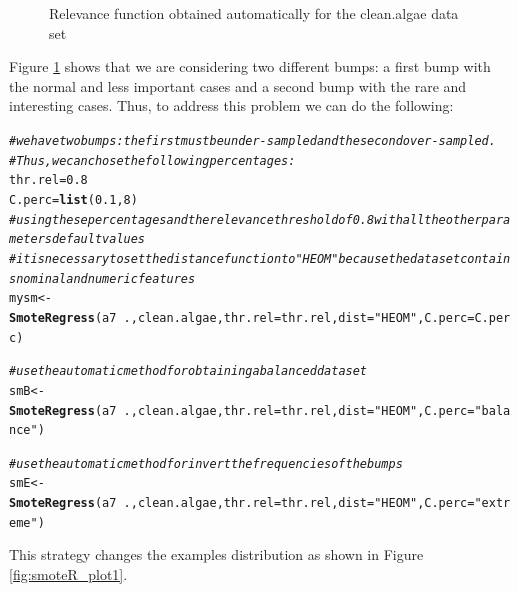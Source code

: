 \documentclass[10pt,a4paper]{article}\usepackage[]{graphicx}\usepackage[]{color}
\makeatletter
\newcommand{\hlnum}[1]{\textcolor[rgb]{0.686,0.059,0.569}{#1}}%
\newcommand{\hlstr}[1]{\textcolor[rgb]{0.192,0.494,0.8}{#1}}%
\newcommand{\hlcom}[1]{\textcolor[rgb]{0.678,0.584,0.686}{\textit{#1}}}%
\newcommand{\hlopt}[1]{\textcolor[rgb]{0,0,0}{#1}}%
\newcommand{\hlstd}[1]{\textcolor[rgb]{0.345,0.345,0.345}{#1}}%
\newcommand{\hlkwb}[1]{\textcolor[rgb]{0.69,0.353,0.396}{#1}}%
\newcommand{\hlkwc}[1]{\textcolor[rgb]{0.333,0.667,0.333}{#1}}%
\newcommand{\hlkwd}[1]{\textcolor[rgb]{0.737,0.353,0.396}{\textbf{#1}}}%
\newenvironment{kframe}{%
 \def\at@end@of@kframe{}%
 \ifinner\ifhmode%
  \def\at@end@of@kframe{\end{minipage}}%
  \begin{minipage}{\columnwidth}%
 \fi\fi%
 \def\FrameCommand##1{\hskip\@totalleftmargin \hskip-\fboxsep
 \colorbox{shadecolor}{##1}\hskip-\fboxsep
     \hskip-\linewidth \hskip-\@totalleftmargin \hskip\columnwidth}%
 \MakeFramed {\advance\hsize-\width
   \@totalleftmargin\z@ \linewidth\hsize
   \@setminipage}}%
 {\par\unskip\endMakeFramed%
 \at@end@of@kframe}
\newenvironment{knitrout}{}{} %
\makeatother
\begin{document}
\begin{knitrout}
\begin{figure}
{}

\caption[Relevance function obtained automatically for the clean]{Relevance function obtained automatically for the clean.algae data set}\label{fig:smoteR_rel1}
\end{figure}


\end{knitrout}

Figure \ref{fig:smoteR_rel1} shows that we are considering two different bumps: a first bump with the normal and less important cases and a second bump with the rare and interesting cases. Thus, to address this problem we can do the following:

\begin{knitrout}\footnotesize
{}\color{fgcolor}\begin{kframe}
\begin{alltt}
\hlcom{# we have two bumps: the first must be under-sampled and the second over-sampled. }
\hlcom{# Thus, we can chose the following percentages: }
\hlstd{thr.rel}\hlkwb{=}\hlnum{0.8}
\hlstd{C.perc}\hlkwb{=}\hlkwd{list}\hlstd{(}\hlnum{0.1}\hlstd{,} \hlnum{8}\hlstd{)}
\hlcom{# using these percentages and the relevance threshold of 0.8 with all the other parameters default values}
\hlcom{# it is necessary to set the distance function to "HEOM" because the data set contains nominal and numeric features}
\hlstd{mysm} \hlkwb{<-} \hlkwd{SmoteRegress}\hlstd{(a7}\hlopt{~}\hlstd{., clean.algae,} \hlkwc{thr.rel}\hlstd{=thr.rel,} \hlkwc{dist}\hlstd{=}\hlstr{"HEOM"}\hlstd{,} \hlkwc{C.perc}\hlstd{=C.perc)}

\hlcom{# use the automatic method for obtaining a balanced data set}
\hlstd{smB} \hlkwb{<-} \hlkwd{SmoteRegress}\hlstd{(a7}\hlopt{~}\hlstd{., clean.algae,} \hlkwc{thr.rel}\hlstd{=thr.rel,} \hlkwc{dist}\hlstd{=}\hlstr{"HEOM"}\hlstd{,} \hlkwc{C.perc}\hlstd{=}\hlstr{"balance"}\hlstd{)}

\hlcom{# use the automatic method for invert the frequencies of the bumps}
\hlstd{smE} \hlkwb{<-} \hlkwd{SmoteRegress}\hlstd{(a7}\hlopt{~}\hlstd{., clean.algae,} \hlkwc{thr.rel}\hlstd{=thr.rel,} \hlkwc{dist}\hlstd{=}\hlstr{"HEOM"}\hlstd{,} \hlkwc{C.perc}\hlstd{=}\hlstr{"extreme"}\hlstd{)}
\end{alltt}
\end{kframe}
\end{knitrout}

This strategy changes the examples distribution as shown in Figure \ref{fig:smoteR_plot1}.
\end{document}
